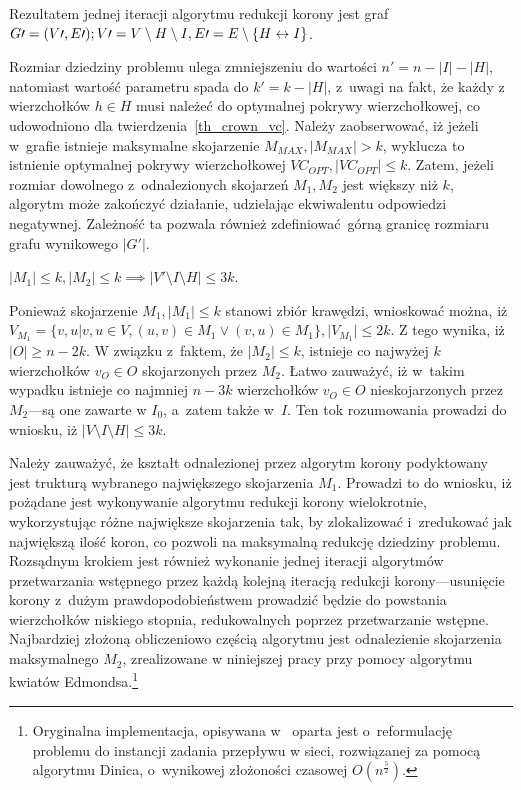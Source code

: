 \par{
  Rezultatem jednej iteracji algorytmu redukcji korony jest graf
  $G\prime=(V\prime, E\prime);\\V\prime=V\setminus H \setminus I, E\prime = E
  \setminus \{H\leftrightarrow I\}$.

  Rozmiar dziedziny problemu ulega zmniejszeniu do wartości
  $n\prime=n-|I|-|H|$, natomiast wartość parametru spada do $k\prime=k-|H|$,
  z~uwagi na fakt, że każdy z wierzchołków $h \in H$ musi należeć do optymalnej
  pokrywy wierzchołkowej, co udowodniono dla twierdzenia~\ref{th_crown_vc}.
  Należy zaobserwować, iż jeżeli w~grafie istnieje maksymalne skojarzenie
  $M_{MAX}, |M_{MAX}| > k$, wyklucza to istnienie optymalnej pokrywy
  wierzchołkowej $VC_{OPT}, |VC_{OPT}|\leq k$.
  Zatem, jeżeli rozmiar dowolnego z~odnalezionych skojarzeń $M_1, M_2$ jest
  większy niż $k$, algorytm może zakończyć działanie, udzielając ekwiwalentu 
  odpowiedzi negatywnej.
  Zależność ta pozwala również zdefiniować górną granicę rozmiaru grafu 
  wynikowego $|G\prime|$.
}
\begin{theorem}
  $|M_1| \leq k, |M_2| \leq k \implies |V\prime \setminus I \setminus H|
  \leq 3k$.
\end{theorem}
\begin{bproof}
  Ponieważ skojarzenie $M_1, |M_1| \leq k$ stanowi zbiór krawędzi, wnioskować
  można, iż $V_{M_1}=\{v, u|v, u \in V, (u,v)\in M_1 \lor (v,u) \in M_1\}, |V_{M_1}| \leq
  2k$.
  Z tego wynika, iż $|O| \geq n-2k$.
  W związku z~faktem, że $|M_2| \leq k$, istnieje co najwyżej $k$ wierzchołków
  $v_O \in O$ skojarzonych przez $M_2$.
  Łatwo zauważyć, iż w~takim wypadku istnieje co najmniej $n-3k$ wierzchołków
  $v_O \in O$ nieskojarzonych przez $M_2$---są one zawarte w $I_0$, a~zatem
  także w~$I$.
  Ten tok rozumowania prowadzi do wniosku, iż $|V \setminus I \setminus H|
  \leq 3k$.
\end{bproof}
\par{
  Należy zauważyć, że kształt odnalezionej przez algorytm korony podyktowany
  jest trukturą wybranego największego skojarzenia $M_1$.
  Prowadzi to do wniosku, iż pożądane jest wykonywanie algorytmu redukcji korony
  wielokrotnie, wykorzystując różne największe skojarzenia tak, by zlokalizować 
  i~zredukować jak największą ilość koron, co pozwoli na maksymalną redukcję
  dziedziny problemu.
  Rozsądnym krokiem jest również wykonanie jednej iteracji algorytmów 
  przetwarzania wstępnego przez każdą kolejną iteracją redukcji 
  korony---usunięcie korony z~dużym prawdopodobieństwem prowadzić będzie do 
  powstania wierzchołków niskiego stopnia, redukowalnych poprzez przetwarzanie
  wstępne.
  Najbardziej złożoną obliczeniowo częścią algorytmu jest odnalezienie
  skojarzenia maksymalnego $M_2$, zrealizowane w niniejszej pracy przy pomocy 
  algorytmu kwiatów Edmondsa.\footnote{
    Oryginalna implementacja, opisywana
    w~\cite{KernelizationAlgorithms04} oparta jest o~reformulację problemu do
    instancji zadania przepływu w sieci, rozwiązanej za pomocą algorytmu Dinica,
    o~wynikowej złożoności czasowej $O(n^{\frac{5}{2}})$.
  }
}


